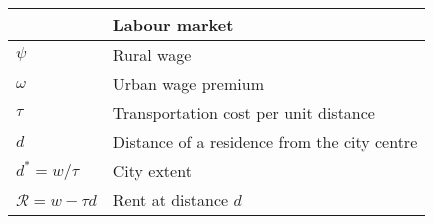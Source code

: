 \begin{longtable}{lp{10cm}}
\hline           &  \textbf{Labour market}      \\ \hline %
$\psi$           &  Rural wage                  \\ %
$\omega$         &  Urban wage premium          \\
$\tau$           &  Transportation cost per unit distance \\
$d$              &  Distance of a residence from the city centre \\
$d^* = w/\tau$   &  City extent \\ %
$\mathcal{R} = w-\tau d$ & Rent at distance $d$ \\ 


\end{longtable}
